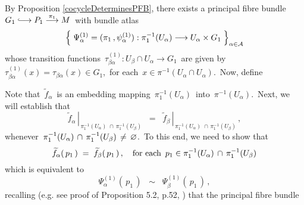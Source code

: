 \vskip 0.3cm
\noindent
By Proposition \ref{cocycleDeterminesPFB}, there exists a principal fibre bundle
\,$G_{1} \longhookrightarrow P_{1} \overset{\pi_{1}}{\longrightarrow} M$\,
with bundle atlas
\begin{equation*}
\left\{\;
	\Psi^{(1)}_{\alpha} = (\pi_{1}\,,\psi^{(1)}_{\alpha})
	: \pi_{1}^{-1}(U_{\alpha}) \overset{{\color{white}1}}{\longrightarrow} U_{\alpha} \times G_{1}
	\;\right\}_{\alpha\in\mathcal{A}}
\end{equation*}
whose transition functions
\,$\tau^{(1)}_{\beta\alpha} : U_{\beta} \cap U_{\alpha} \longrightarrow G_{1}$\,
are given by
\,$\tau^{(1)}_{\beta\alpha}(x) = \tau_{\beta\alpha}(x) \in G_{1}$,\,
for each \,$x \in \pi^{-1}(U_{\alpha} \cap U_{\alpha})$.\,
Now, define
\begin{center}
\end{center}
Note that \,$\widetilde{f}_{\alpha}$\, is an embedding
mapping \,$\pi_{1}^{-1}(U_{\alpha})$\, into \,$\pi^{-1}(U_{\alpha})$.\,
Next, we will establish that
\begin{equation*}
\left.\widetilde{f}_{\alpha}\,\right\vert_{\,\pi_{1}^{-1}(U_{\alpha})\;\cap\,\pi_{1}^{-1}(U_{\beta})}
\;\; = \;\;
\left.\widetilde{f}_{\beta}\,\right\vert_{\,\pi_{1}^{-1}(U_{\alpha})\;\cap\,\pi_{1}^{-1}(U_{\beta})}\,,
\end{equation*}
whenever
\,$\pi_{1}^{-1}(U_{\alpha})\,\cap\,\pi_{1}^{-1}(U_{\beta}) \,\neq\, \varnothing$.\,
To this end, we need to show that
\begin{equation*}
\widetilde{f}_{\alpha}(\,p_{1}\,)
\; = \;
	\widetilde{f}_{\beta}(\,p_{1}\,)\,,
\quad
\textnormal{for each \,$p_{1} \in \pi_{1}^{-1}(U_{\alpha})\,\cap\,\pi_{1}^{-1}(U_{\beta})$}
\end{equation*}
which is equivalent to
\begin{equation*}
\Psi^{(1)}_{\alpha}(\,p_{1}\,)
\;\; \sim \;\;
	\Psi^{(1)}_{\beta}(\,p_{1}\,)\,,
\end{equation*}
recalling (e.g. see proof of Proposition 5.2, p.52, \cite{Kobayashi1963v1}) that the principal fibre bundle

